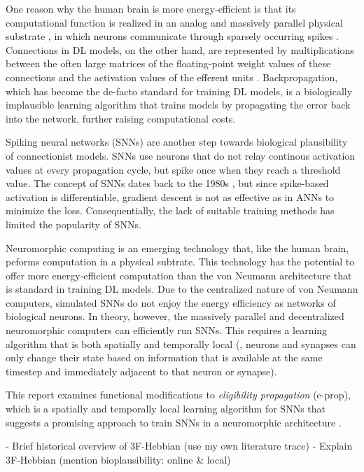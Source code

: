 One reason why the human brain is more energy-efficient is that its computational function is realized in an analog and massively parallel physical substrate \citep{a2017parallel}, in which neurons communicate through sparsely occurring spikes \citep{bear2020neuroscience}.
Connections in DL models, on the other hand, are represented by multiplications between the often large matrices of the floating-point weight values of these connections and the activation values of the efferent units \citep{lecun2015deep}.
Backpropagation, which has become the de-facto standard for training DL models, is a biologically implausible learning algorithm that trains models by propagating the error back into the network, further raising computational costs.

Spiking neural networks (SNNs) are another step towards biological plausibility of connectionist models.
SNNs use neurons that do not relay continous activation values at every propagation cycle, but spike once when they reach a threshold value.
The concept of SNNs dates back to the 1980s \citep{hopfield1982neural}, but since spike-based activation is differentiable, gradient descent is not as effective as in ANNs to minimize the loss.
Consequentially, the lack of suitable training methods has limited the popularity of SNNs.

Neuromorphic computing is an emerging technology that, like the human brain, peforms computation in a physical subtrate.
This technology has the potential to offer more energy-efficient computation than the von Neumann architecture that is standard in training DL models.
Due to the centralized nature of von Neumann computers, simulated SNNs do not enjoy the energy efficiency as networks of biological neurons.
In theory, however, the massively parallel and decentralized neuromorphic computers can efficiently run SNNs.
This requires a learning algorithm that is both spatially and temporally local (\ie, neurons and synapses can only change their state based on information that is available at the same timestep and immediately adjacent to that neuron or synapse).

This report examines functional modifications to \emph{eligibility propagation} (e-prop), which is a spatially and temporally local learning algorithm for SNNs that suggests a promising approach to train SNNs in a neuromorphic architecture \citep{bellec2020solution}.

\begin{tcolorbox}[colback=orange]
- Brief historical overview of 3F-Hebbian (use my own literature trace)
    - Explain 3F-Hebbian (mention bioplausibility: online \& local)



\end{tcolorbox}

